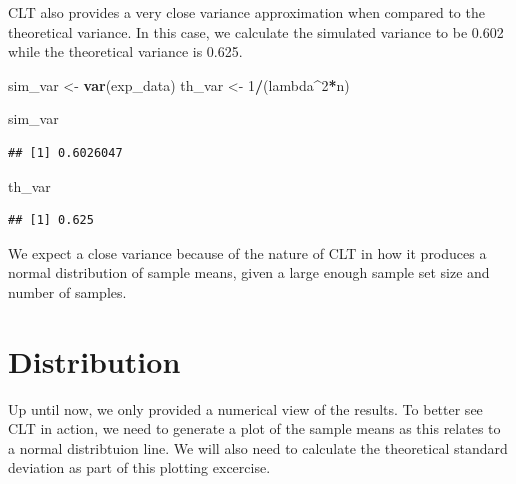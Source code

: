 \documentclass[]{article}
\newenvironment{Shaded}{\begin{snugshade}}{\end{snugshade}}
\newcommand{\DecValTok}[1]{\textcolor[rgb]{0.00,0.00,0.81}{#1}}
\newcommand{\KeywordTok}[1]{\textcolor[rgb]{0.13,0.29,0.53}{\textbf{#1}}}
\newcommand{\NormalTok}[1]{#1}
\newcommand{\OperatorTok}[1]{\textcolor[rgb]{0.81,0.36,0.00}{\textbf{#1}}}
\newcommand{\StringTok}[1]{\textcolor[rgb]{0.31,0.60,0.02}{#1}}
\begin{document}
CLT also provides a very close variance approximation when compared to
the theoretical variance. In this case, we calculate the simulated
variance to be 0.602 while the theoretical variance is 0.625.

\begin{Shaded}
\begin{Highlighting}[]
\NormalTok{sim_var    <-}\StringTok{ }\KeywordTok{var}\NormalTok{(exp_data)}
\NormalTok{th_var     <-}\StringTok{ }\DecValTok{1}\OperatorTok{/}\NormalTok{(lambda}\OperatorTok{^}\DecValTok{2}\OperatorTok{*}\NormalTok{n)}

\NormalTok{sim_var }
\end{Highlighting}
\end{Shaded}

\begin{verbatim}
## [1] 0.6026047
\end{verbatim}

\begin{Shaded}
\begin{Highlighting}[]
\NormalTok{th_var}
\end{Highlighting}
\end{Shaded}

\begin{verbatim}
## [1] 0.625
\end{verbatim}

We expect a close variance because of the nature of CLT in how it
produces a normal distribution of sample means, given a large enough
sample set size and number of samples.

\hypertarget{distribution}{%
\section{Distribution}\label{distribution}}

Up until now, we only provided a numerical view of the results. To
better see CLT in action, we need to generate a plot of the sample means
as this relates to a normal distribtuion line. We will also need to
calculate the theoretical standard deviation as part of this plotting
excercise.
\end{document}
